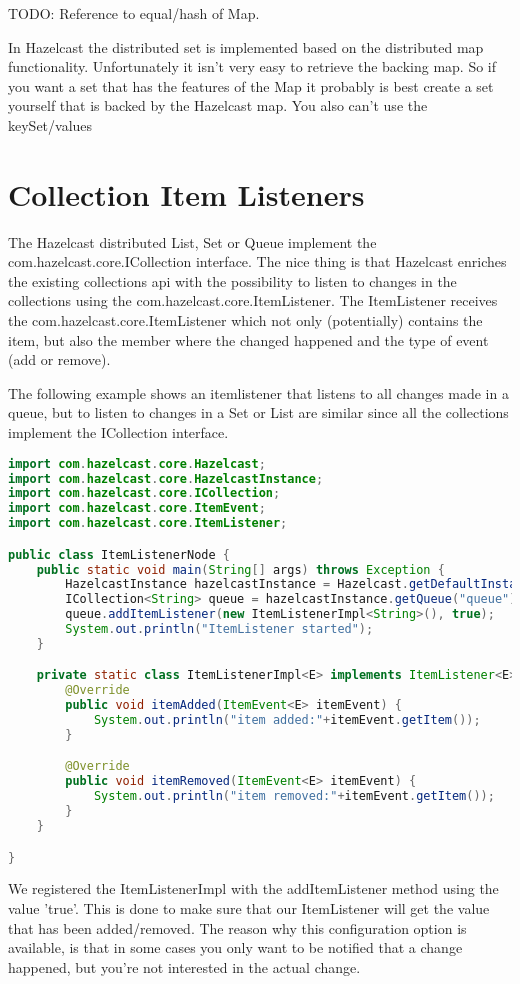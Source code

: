 TODO: Reference to equal/hash of Map.

In Hazelcast the distributed set is implemented based on the distributed map functionality. Unfortunately it isn't very easy to retrieve the backing map. So if you want a set that has the features of the Map it probably is best create a set yourself that is backed by the Hazelcast map. You also can't use the keySet/values

\section{Collection Item Listeners}

The Hazelcast distributed List, Set or Queue implement the com.hazelcast.core.ICollection interface. The nice thing is that Hazelcast enriches the existing collections api with the possibility to listen to changes in the collections using the com.hazelcast.core.ItemListener. The ItemListener receives the com.hazelcast.core.ItemListener which not only (potentially) contains the item, but also the member where the changed happened and the type of event (add or remove).

The following example shows an itemlistener that listens to all changes made in a queue, but to listen to changes in a Set or List are similar since all the collections implement the ICollection interface.
\begin{lstlisting}[language=java]
import com.hazelcast.core.Hazelcast;
import com.hazelcast.core.HazelcastInstance;
import com.hazelcast.core.ICollection;
import com.hazelcast.core.ItemEvent;
import com.hazelcast.core.ItemListener;

public class ItemListenerNode {
    public static void main(String[] args) throws Exception {
        HazelcastInstance hazelcastInstance = Hazelcast.getDefaultInstance();
        ICollection<String> queue = hazelcastInstance.getQueue("queue");
        queue.addItemListener(new ItemListenerImpl<String>(), true);
        System.out.println("ItemListener started");
    }

    private static class ItemListenerImpl<E> implements ItemListener<E> {
        @Override
        public void itemAdded(ItemEvent<E> itemEvent) {
            System.out.println("item added:"+itemEvent.getItem());
        }

        @Override
        public void itemRemoved(ItemEvent<E> itemEvent) {
            System.out.println("item removed:"+itemEvent.getItem());
        }
    }

}
\end{lstlisting}
We registered the ItemListenerImpl with the addItemListener method using the value 'true'. This is done to make sure that our ItemListener will get the value that has been added/removed. The reason why this configuration option is available, is that in some cases you only want to be notified that a change happened, but you're not interested in the actual change.

